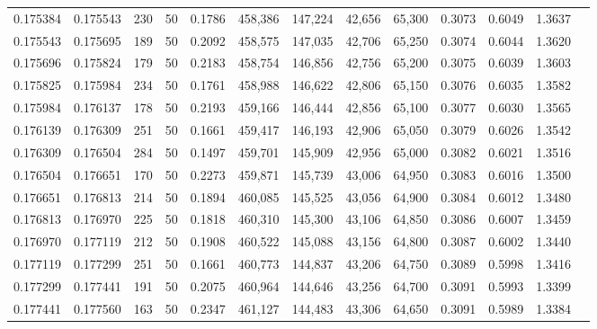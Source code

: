\begin{tabular}{rrrrrrrrrrrrr}
0.175384 & 0.175543 &   230 &  50 &                                     0.1786 & 458,386 & 147,224 &  42,656 &  65,300 & 0.3073 & 0.6049 & 1.3637 \\
0.175543 & 0.175695 &   189 &  50 &                                     0.2092 & 458,575 & 147,035 &  42,706 &  65,250 & 0.3074 & 0.6044 & 1.3620 \\
0.175696 & 0.175824 &   179 &  50 &                                     0.2183 & 458,754 & 146,856 &  42,756 &  65,200 & 0.3075 & 0.6039 & 1.3603 \\
0.175825 & 0.175984 &   234 &  50 &                                     0.1761 & 458,988 & 146,622 &  42,806 &  65,150 & 0.3076 & 0.6035 & 1.3582 \\
0.175984 & 0.176137 &   178 &  50 &                                     0.2193 & 459,166 & 146,444 &  42,856 &  65,100 & 0.3077 & 0.6030 & 1.3565 \\
0.176139 & 0.176309 &   251 &  50 &                                     0.1661 & 459,417 & 146,193 &  42,906 &  65,050 & 0.3079 & 0.6026 & 1.3542 \\
0.176309 & 0.176504 &   284 &  50 &                                     0.1497 & 459,701 & 145,909 &  42,956 &  65,000 & 0.3082 & 0.6021 & 1.3516 \\
0.176504 & 0.176651 &   170 &  50 &                                     0.2273 & 459,871 & 145,739 &  43,006 &  64,950 & 0.3083 & 0.6016 & 1.3500 \\
0.176651 & 0.176813 &   214 &  50 &                                     0.1894 & 460,085 & 145,525 &  43,056 &  64,900 & 0.3084 & 0.6012 & 1.3480 \\
0.176813 & 0.176970 &   225 &  50 &                                     0.1818 & 460,310 & 145,300 &  43,106 &  64,850 & 0.3086 & 0.6007 & 1.3459 \\
0.176970 & 0.177119 &   212 &  50 &                                     0.1908 & 460,522 & 145,088 &  43,156 &  64,800 & 0.3087 & 0.6002 & 1.3440 \\
0.177119 & 0.177299 &   251 &  50 &                                     0.1661 & 460,773 & 144,837 &  43,206 &  64,750 & 0.3089 & 0.5998 & 1.3416 \\
0.177299 & 0.177441 &   191 &  50 &                                     0.2075 & 460,964 & 144,646 &  43,256 &  64,700 & 0.3091 & 0.5993 & 1.3399 \\
0.177441 & 0.177560 &   163 &  50 &                                     0.2347 & 461,127 & 144,483 &  43,306 &  64,650 & 0.3091 & 0.5989 & 1.3384 \\

\end{tabular}
